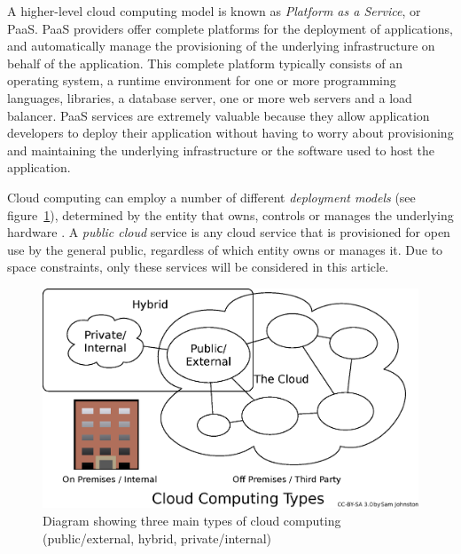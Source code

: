 \documentclass[a4paper]{proc}
\begin{document}
  A higher-level cloud computing model is known as \emph{Platform as a Service}, or PaaS. PaaS providers offer complete platforms for the deployment of applications, and automatically manage the provisioning of the underlying infrastructure on behalf of the application. This complete platform typically consists of an operating system, a runtime environment for one or more programming languages, libraries, a database server, one or more web servers and a load balancer. PaaS services are extremely valuable because they allow application developers to deploy their application without having to worry about provisioning and maintaining the underlying infrastructure or the software used to host the application.

  Cloud computing can employ a number of different \emph{deployment models} (see figure~\ref{fig:cloud_computing_types}), determined by the entity that owns, controls or manages the underlying hardware \cite{Mell2011}. A \emph{public cloud} service is any cloud service that is provisioned for open use by the general public, regardless of which entity owns or manages it. Due to space constraints, only these services will be considered in this article.

  \begin{figure}
    \centering
    \includegraphics[width=\columnwidth]{figures/Cloud_computing_types.eps}
    \caption{Diagram showing three main types of cloud computing (public/external, hybrid, private/internal) \cite{Joton2009}}
    \label{fig:cloud_computing_types}
  \end{figure}
\end{document}
